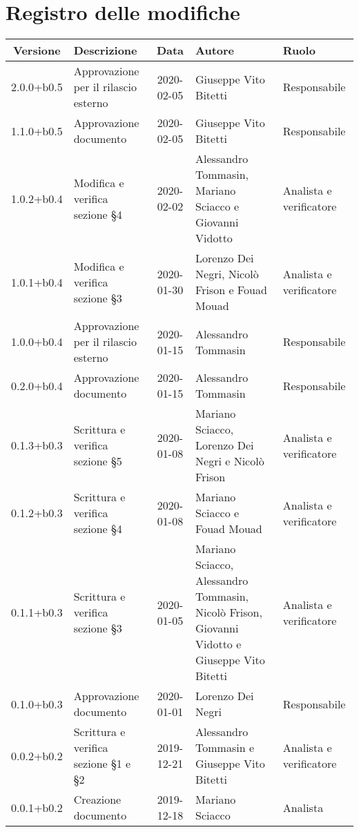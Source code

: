 \section*{Registro delle modifiche}

\begin{center}
	\begin{longtable}{|c|p{3.5cm}|c|p{3cm}|p{3cm}|}
	\hline
	\rowcolor{lighter-grayer}
	\textbf{Versione} & \textbf{Descrizione} & \textbf{Data} & \textbf{Autore} & \textbf{Ruolo} \\
	\hline
	\endfirsthead


	2.0.0+b0.5 & Approvazione per il rilascio esterno & 2020-02-05 & Giuseppe Vito Bitetti & Responsabile \\
	\hline
	1.1.0+b0.5 & Approvazione documento & 2020-02-05 & Giuseppe Vito Bitetti & Responsabile \\
	\hline
	1.0.2+b0.4 & Modifica e verifica sezione \S4 & 2020-02-02 & Alessandro Tommasin, Mariano Sciacco e Giovanni Vidotto & Analista e verificatore \\
	\hline
	1.0.1+b0.4 & Modifica e verifica sezione \S3 & 2020-01-30 & Lorenzo Dei Negri, Nicolò Frison e Fouad Mouad & Analista e verificatore \\
	\hline
	1.0.0+b0.4 & Approvazione per il rilascio esterno & 2020-01-15 & Alessandro Tommasin & Responsabile \\
	\hline
	0.2.0+b0.4 & Approvazione documento & 2020-01-15 & Alessandro Tommasin & Responsabile \\
	\hline
	0.1.3+b0.3 & Scrittura e verifica sezione \S5 & 2020-01-08 & Mariano Sciacco, Lorenzo Dei Negri e Nicolò Frison & Analista e verificatore \\
	\hline
	0.1.2+b0.3 & Scrittura e verifica sezione \S4 & 2020-01-08 & Mariano Sciacco e Fouad Mouad & Analista e verificatore \\
	\hline
	0.1.1+b0.3 & Scrittura e verifica sezione \S3 & 2020-01-05 & Mariano Sciacco, Alessandro Tommasin, Nicolò Frison, Giovanni Vidotto e Giuseppe Vito Bitetti & Analista e verificatore \\
	\hline
	0.1.0+b0.3 & Approvazione documento & 2020-01-01 & Lorenzo Dei Negri & Responsabile \\
	\hline
	0.0.2+b0.2 & Scrittura e verifica sezione \S1 e \S2 & 2019-12-21 & Alessandro Tommasin e Giuseppe Vito Bitetti & Analista e verificatore \\
	\hline
	0.0.1+b0.2 & Creazione documento & 2019-12-18 & Mariano Sciacco & Analista \\
	\hline

	\end{longtable}
\end{center}
